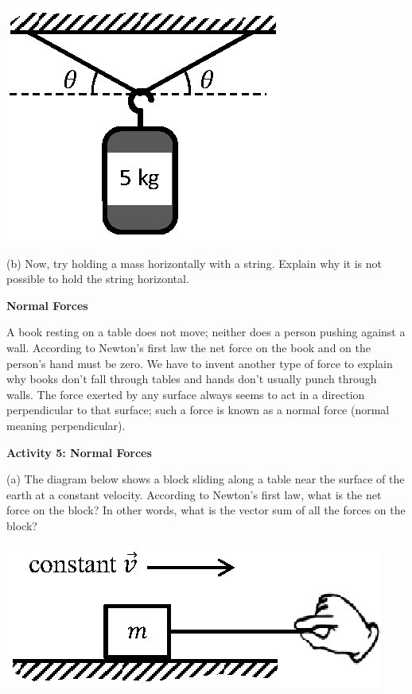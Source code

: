 \vspace{0.3cm}
\hspace{0.5in}\includegraphics[scale=1.2]{newton/newton_fig8_new.eps}
\vspace{0.3cm}

(b) Now, try holding a mass horizontally with a string. Explain why it is not possible to hold the string horizontal.
\answerspace{20mm}

\textbf{Normal Forces} 

A book resting on a table does not move; neither does a person pushing against
a wall. According to Newton's first law the net force on the book and on the
person's hand must be zero. We have to invent another type of force
to explain why books don't fall through tables and hands don't usually punch
through walls. The force exerted by any surface always seems to act in a direction perpendicular to that surface; such a force is known as a normal force (normal meaning perpendicular).

\textbf{Activity 5: Normal Forces }

(a) The diagram below shows a block sliding along a table near the surface of
the earth at a constant velocity. According to Newton's first law, what is the
net force on the block? In other words, what is the vector sum of all the forces on the block?

\vspace{0.3cm}
\hspace{0.5in}\includegraphics{newton/newton_fig9_new.eps}
\vspace{0.3cm}

